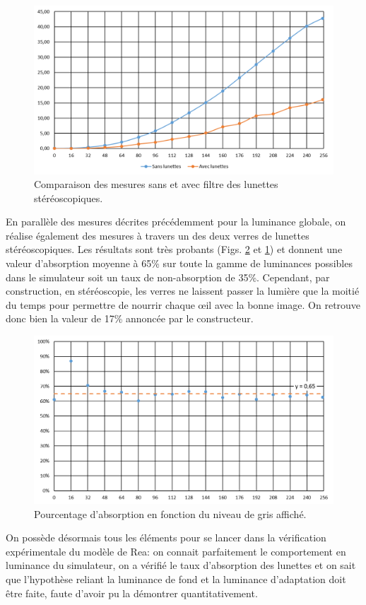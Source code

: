 	\begin{figure}
		\centering
		\includegraphics[scale=.75]{Figures/CourbesLuminanceLunettesStereo}
		\caption{Comparaison des mesures sans et avec filtre des lunettes stéréoscopiques.}
		\label{fig:courbes_luminance_avec_sans_filtre}
	\end{figure}
	
	\par En parallèle des mesures décrites précédemment pour la luminance globale, on réalise également des mesures à travers un des deux verres de lunettes stéréoscopiques. Les résultats sont très probants (Figs. \ref{fig:pourcentage_absorption} et \ref{fig:courbes_luminance_avec_sans_filtre}) et donnent une valeur d'absorption moyenne à 65\% sur toute la gamme de luminances possibles dans le simulateur soit un taux de non-absorption de 35\%. Cependant, par construction, en stéréoscopie, les verres ne laissent passer la lumière que la moitié du temps pour permettre de nourrir chaque œil avec la bonne image. On retrouve donc bien la valeur de 17\% annoncée par le constructeur.
	
	\begin{figure}
		\centering
		\includegraphics[scale=.75]{Figures/PourcentageAbsorption}
		\caption{Pourcentage d'absorption en fonction du niveau de gris affiché.}
		\label{fig:pourcentage_absorption}
	\end{figure}
	
	\par On possède désormais tous les éléments pour se lancer dans la vérification expérimentale du modèle de Rea: on connait parfaitement le comportement en luminance du simulateur, on a vérifié le taux d'absorption des lunettes et on sait que l'hypothèse reliant la luminance de fond et la luminance d'adaptation doit être faite, faute d'avoir pu la démontrer quantitativement.
